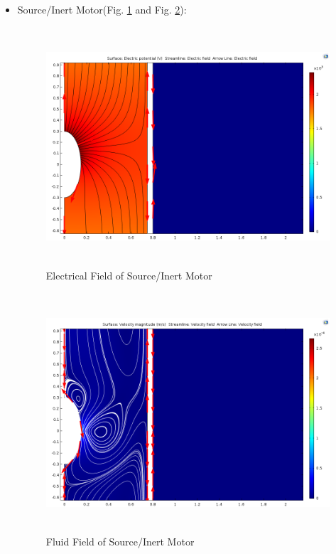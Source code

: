\documentclass[fontsize=11pt, %
                             paper=a4, %
                             twoside, %
                             captions=tableheading,
                             index=totoc,
                             hyperref]{labbook}
\begin{document}
\begin{addmargin}[4cm]{0cm}
\begin{itemize}
\item Source/Inert Motor(Fig. \ref{2016-11-13-EFOSIM} and Fig. \ref{2016-11-13-FFOSIM}):
\begin{figure}
\centering
\includegraphics[width=\linewidth, height=3.5in]{2016-11-13-SourceInert-E.png}
\caption{Electrical Field of Source/Inert Motor}\label{2016-11-13-EFOSIM}
\end{figure}
\begin{figure}
\centering
\includegraphics[width=\linewidth, height=3.5in]{2016-11-13-SourceInert-V.png}
\caption{Fluid Field of Source/Inert Motor}\label{2016-11-13-FFOSIM}
\end{figure}
\end{itemize}

\end{addmargin}
\end{document}
